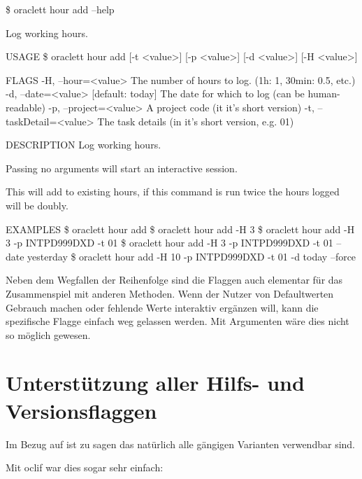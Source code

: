 \documentclass[oneside,bibliography=totocnumbered,BCOR=5mm]{scrbook}
\newenvironment{code}{\captionsetup{type=listing, skip=0pt}}{}
\begin{document}
\begin{code}
  \begin{shellcode}
\$ oraclett hour add --help

Log working hours.

USAGE
  \$ oraclett hour add [-t <value>] [-p <value>] [-d <value>] [-H <value>]

FLAGS
  -H, --hour=<value>        The number of hours to log. (1h: 1, 30min: 0.5, etc.)
  -d, --date=<value>        [default: today] The date for which to log (can be human-readable)
  -p, --project=<value>     A project code (it it's short version)
  -t, --taskDetail=<value>  The task details (in it's short version, e.g. 01)

DESCRIPTION
  Log working hours.

  Passing no arguments will start an interactive session.

  This will add to existing hours, if this command is run twice the hours logged will be doubly.

EXAMPLES
  \$ oraclett hour add
  \$ oraclett hour add -H 3
  \$ oraclett hour add -H 3 -p INTPD999DXD -t 01
  \$ oraclett hour add -H 3 -p INTPD999DXD -t 01 --date yesterday
  \$ oraclett hour add -H 10 -p INTPD999DXD -t 01 -d today --force
  \end{shellcode}
  \medskip
\end{code}

Neben dem Wegfallen der Reihenfolge sind die Flaggen auch elementar für das
Zusammenspiel mit anderen Methoden. Wenn der Nutzer von Defaultwerten Gebrauch
machen oder fehlende Werte interaktiv ergänzen will, kann die spezifische Flagge
einfach weg gelassen werden. Mit Argumenten wäre dies nicht so möglich gewesen.

\section{Unterstützung aller Hilfs- und Versionsflaggen}

Im Bezug auf  ist zu sagen das natürlich alle
gängigen Varianten verwendbar sind.

Mit oclif war dies sogar sehr einfach:
\begin{code}
  \begin{javascriptcode}
...
"oclif": {
  "additionalHelpFlags": [
    "-h",
    "help"
  ],
  "additionalVersionFlags": [
    "-v",
    "-V",
    "version"
  ],
  ...
  \end{javascriptcode}
  \medskip
\end{code}
\end{document}
